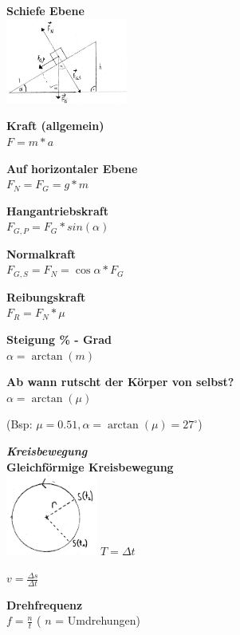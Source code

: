 \documentclass[a4paper,9pt]{article}
\begin{document}
\begin{multicols}{4}
	\textbf{Schiefe Ebene} \\
	\includegraphics[width=4cm]{gr1}
	

\textbf{Kraft (allgemein)} \\
	\(F = m * a\)
	

\textbf{Auf horizontaler Ebene} \\
	\(F_N = F_G = g * m\)
	

\textbf{Hangantriebskraft} \\
	\(F_{G,P} = F_G * sin(\alpha)\)
	

\textbf{Normalkraft} \\
	\(F_{G,S} = F_N = \cos\alpha*F_G\)
	

\textbf{Reibungskraft} \\
	\(F_R = F_N * \mu\)
	

\textbf{Steigung \% - Grad} \\
	\(\alpha = \arctan(m) \)
	

\textbf{Ab wann rutscht der Körper von selbst?} \\
	\(\alpha = \arctan(\mu)\)
	
	 (Bsp: \(\mu = 0.51, \alpha = \arctan(\mu) = 27^\circ\))
	
	
	
	
	

\textbf{\textit{Kreisbewegung}} \\
	

\textbf{Gleichförmige Kreisbewegung} \\
	\includegraphics[width=3cm]{gr2.png}
	$ T=\Delta t $
	
	$ v=\frac{\Delta s}{\Delta t} $
	
	

\textbf{Drehfrequenz} \\
	
	$ f = \frac{n}{t} $ ( $n$ = Umdrehungen)
	

\end{multicols}
\end{document}
